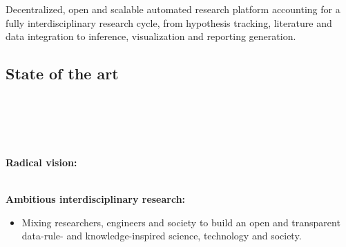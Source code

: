 \documentclass[english,12pt]{article}
\begin{document}

Decentralized, open and scalable automated research platform
accounting for a fully interdisciplinary research cycle, from
hypothesis tracking, literature and data
integration to inference, visualization and reporting generation.\\



\subsection{State of the art}
\\
\\
\begin{mybox}\begin{singlespace}
 {\bf{}}\\
 \begin{small}
   {\bf Radical vision:}\\
   \\
   {\bf Ambitious interdisciplinary research:}\\
   \begin{itemize}
   \item Mixing researchers, engineers and society to build an open
     and transparent data-rule- and knowledge-inspired science,
     technology and society.
   \end{itemize}
   \\
\end{small}
\end{singlespace}
\end{mybox}
\end{document}
